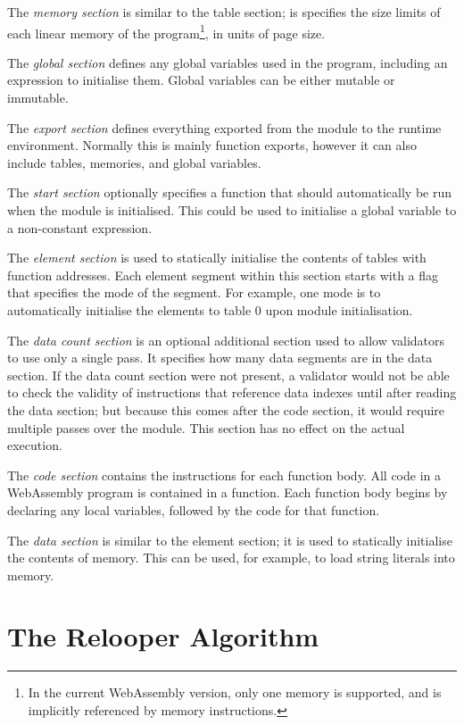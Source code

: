 \documentclass[00-main.tex]{subfiles}
\begin{document}
The \emph{memory section} is similar to the table section; is specifies the size limits of each linear memory of the program\footnote{In the current WebAssembly version, only one memory is supported, and is implicitly referenced by memory instructions.}, in units of page size.

The \emph{global section} defines any global variables used in the program, including an expression to initialise them. Global variables can be either mutable or immutable.

The \emph{export section} defines everything exported from the module to the runtime environment.
Normally this is mainly function exports, however it can also include tables, memories, and global variables.

The \emph{start section} optionally specifies a function that should automatically be run when the module is initialised.
This could be used to initialise a global variable to a non-constant expression.

The \emph{element section} is used to statically initialise the contents of tables with function addresses.
Each element segment within this section starts with a flag that specifies the mode of the segment.
For example, one mode is to automatically initialise the elements to table 0 upon module initialisation.

The \emph{data count section} is an optional additional section used to allow validators to use only a single pass.
It specifies how many data segments are in the data section.
If the data count section were not present, a validator would not be able to check the validity of instructions that reference data indexes until after reading the data section; but because this comes after the code section, it would require multiple passes over the module.
This section has no effect on the actual execution.

The \emph{code section} contains the instructions for each function body.
All code in a WebAssembly program is contained in a function.
Each function body begins by declaring any local variables, followed by the code for that function.

The \emph{data section} is similar to the element section; it is used to statically initialise the contents of memory.
This can be used, for example, to load string literals into memory.


\section{The Relooper Algorithm}
\end{document}
